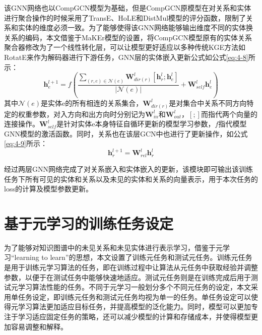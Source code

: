 该GNN网络也以CompGCN模型为基础，但是CompGCN原模型在对关系和实体进行聚合操作的时候采用了TransE、HoLE和DistMul模型的评分函数，限制了关系和实体的维度必须一致。为了能够使得该GNN网络能够输出维度不同的实体换关系的编码，本文借鉴于MaKEr\cite{chen2022meta}模型的设置，将CompGCN模型原有的实体关系聚合器修改为了一个线性转化层，可以让模型更好适应以多种传统KGE方法如RotatE来作为解码器进行下游任务，GNN层的实体嵌入更新公式如公式\ref{eq:4-8}所示：
\begin{equation}
\textbf{h}_{e}^{l+1} = f \left(
\frac{\sum_{(r,e)\in \mathcal{N}(e)}\textbf{W}_{dir(r)}^{l} [\textbf{h}_{r}^{l} ; \textbf{h}_{e}^{l}]}{|\mathcal{N}(e)|} + \textbf{W}_{self}^{l}\textbf{h}_{e}^{l}
\right) \label{eq:4-8}
\end{equation}
其中\(\mathcal{N}(e)\)是实体e的所有相连的关系集合，\(\textbf{W}_{dir(r)}^{l}\)是对集合中关系不同方向特定的权重参数，对入方向和出方向时分别记为\(\textbf{W}_{in}^{l}\)和\(\textbf{W}_{out}^{l}\)，\([;]\)而指代两个向量的连接操作。\(\textbf{W}_{self}^{l}\)是针对实体e本身特征自循环更新的模型学习参数，\(f\)指代模型GNN模型的激活函数。同时，关系也在该层GCN中也进行了更新操作，如公式\ref{eq:4-9}所示：
\begin{equation}
\textbf{h}_{r}^{l+1} = \textbf{W}_{rel}^{l}\textbf{h}_{r}^{l} \label{eq:4-9}
\end{equation}

经过两层GNN网络完成了对关系嵌入和实体嵌入的更新，该模块即可输出该训练任务下所有可见的实体和关系以及未见的实体和关系的向量表示，用于本次任务的loss的计算及模型参数更新。

\section{基于元学习的训练任务设定}
为了能够对知识图谱中的未见关系和未见实体进行表示学习，借鉴于元学习“learning to learn”的思想，本文设置了训练元任务和测试元任务。训练元任务是用于训练元学习算法的任务，即在训练过程中让算法从元任务中获取经验并调整参数，以便于在测试任务中能够快速地适应。测试元任务则是在训练完成后用于测试元学习算法性能的任务。不同于元学习一般划分多个不同元任务的设定，本文采用单任务设定，即训练元任务和测试元任务均视为单一的任务。单任务设定可以使得元学习算法更加适应目标任务，并提高模型的泛化能力。同时，模型可以更加专注于学习适应固定任务的策略，还可以减少模型的计算和存储成本，并使得模型更加容易调整和解释。

